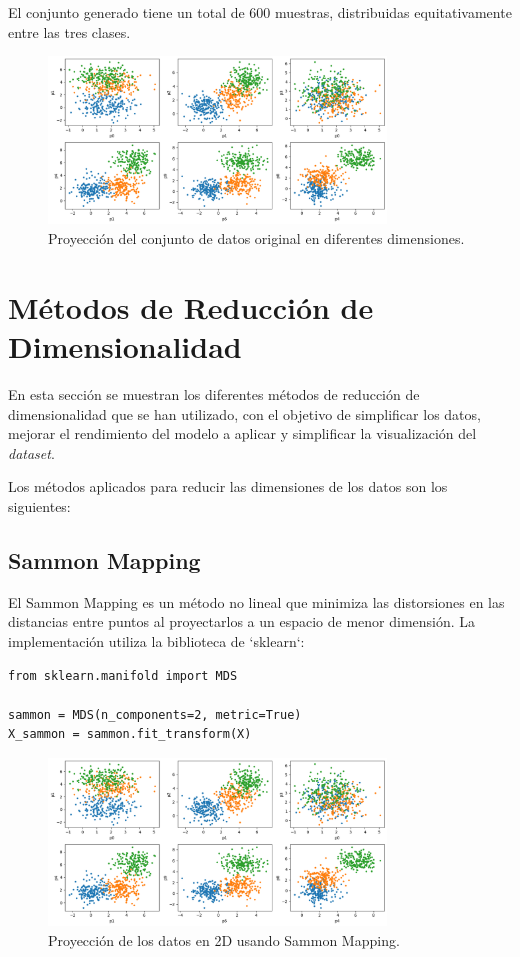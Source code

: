 \documentclass[paper=a4, fontsize=11pt]{scrartcl} %
\numberwithin{equation}{section} %
\numberwithin{figure}{section} %
\numberwithin{table}{section} %
\begin{document}
El conjunto generado tiene un total de 600 muestras, distribuidas equitativamente entre las tres clases.

\begin{figure}[H]
\centering
\includegraphics[width=0.8\textwidth]{images/dataset_projection.png}
\caption{Proyección del conjunto de datos original en diferentes dimensiones.}
\end{figure}

\section{Métodos de Reducción de Dimensionalidad}

En esta sección se muestran los diferentes métodos de reducción de dimensionalidad que se han utilizado, con el objetivo de simplificar los datos, mejorar el rendimiento del modelo a aplicar y simplificar la visualización del \textit{dataset}.

Los métodos aplicados para reducir las dimensiones de los datos son los siguientes:

\subsection{Sammon Mapping}
El Sammon Mapping es un método no lineal que minimiza las distorsiones en las distancias entre puntos al proyectarlos a un espacio de menor dimensión. La implementación utiliza la biblioteca de `sklearn`:

\begin{verbatim}
from sklearn.manifold import MDS

sammon = MDS(n_components=2, metric=True)
X_sammon = sammon.fit_transform(X)
\end{verbatim}

\begin{figure}[H]
\centering
\includegraphics[width=0.8\textwidth]{images/sammon_projection.png}
\caption{Proyección de los datos en 2D usando Sammon Mapping.}
\end{figure}
\end{document}
